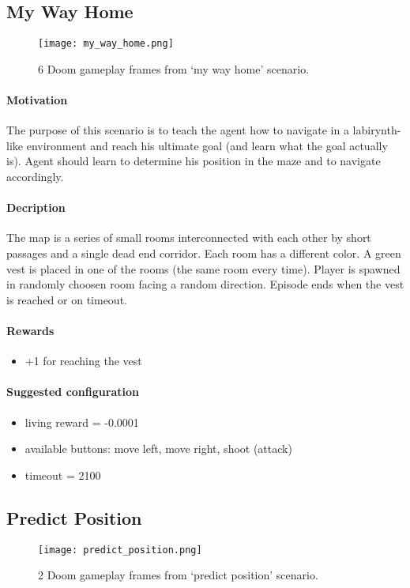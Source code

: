 	\subsection{My Way Home}
		\begin{figure}
			\centering
			\texttt{[image: my\_way\_home.png]}
			\caption{6 Doom gameplay frames from `my way home' scenario.}\label{fig:my_way_home}
		\end{figure}
		\paragraph{Motivation} 
			The purpose of this scenario is to teach the agent how to navigate in a labirynth-like environment and reach his ultimate goal (and learn what the goal actually is). Agent should learn to determine his position in the maze and to navigate accordingly.

		\paragraph{Decription}
			The map is a series of small rooms interconnected with each other by short passages and a single dead end corridor. Each room has a different color. A green vest is placed in one of the rooms (the same room every time). Player is spawned in randomly choosen room facing a random direction. Episode ends when the vest is reached or on timeout.
		\paragraph{Rewards}

		\begin{itemize}
			\item +1 for reaching the vest
		\end{itemize}
		
		\paragraph{Suggested configuration}
		\begin{itemize}
			\item living reward = -0.0001
			\item available buttons: move left, move right, shoot (attack)
			\item timeout = 2100
		\end{itemize}
	\newpage

	\subsection{Predict Position}
		\begin{figure}
			\centering
			\texttt{[image: predict\_position.png]}
			\caption{2 Doom gameplay frames from `predict position' scenario.}\label{fig:predict_position}
		\end{figure}

